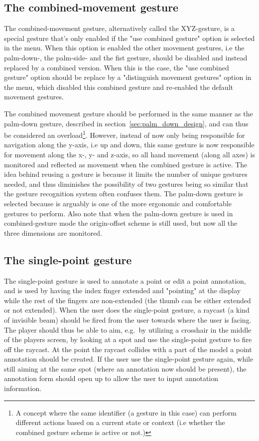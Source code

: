 \subsection{The combined-movement gesture}
\label{sec:combined-movement}
The combined-movement gesture, alternatively called the XYZ-gesture, is a special gesture that's only enabled if the "use combined gesture" option is selected in the menu.
When this option is enabled the other movement gestures, i.e the palm-down-, the palm-side- and the fist gesture, should be disabled and instead replaced by a combined version. 
When this is the case, the "use combined gesture" option should be replace by a "distinguish movement gestures" option in the menu, 
which disabled this combined gesture and re-enabled the default movement gestures. 

The combined movement gesture should be performed in the same manner as the palm-down gesture, described in section~\vref{sec:palm_down_design}, 
and can thus be considered an overload\footnote{A concept where the same identifier (a gesture in this case) can perform different actions based on a current state or context (i.e whether the combined gesture scheme is active or not.)}.
However, instead of now only being responsible for navigation along the y-axis, i.e up and down, this same gesture is now responsible for movement along the x-, y- and z-axis, so
all hand movement (along all axes) is monitored and reflected as movement when the combined gesture is active.
The idea behind reusing a gesture is because it limits the number of unique gestures needed, and thus diminishes the possibility of two gestures being so similar 
that the gesture recognition system often confuses them. The palm-down gesture is selected because is arguably is one of the more ergonomic and comfortable gestures to perform. 
Also note that when the palm-down gesture is used in combined-gesture mode the origin-offset scheme is still used, but now all the three dimensions are monitored. 

\subsection{The single-point gesture}
The single-point gesture is used to annotate a point or edit a point annotation, and is used by having the index finger extended and "pointing" at the display while the 
rest of the fingers are non-extended (the thumb can be either extended or not extended). 
When the user does the single-point gesture, a raycast (a kind of invisible beam) should be fired from the user towards where the user is facing.
The player should thus be able to aim, e.g.~by utilizing a crosshair in the middle of the players screen, by looking at a spot and use the single-point gesture to fire off 
the raycast. At the point the raycast collides with a part of the model a point annotation should be created. If the user use the single-point gesture again, while
still aiming at the same spot (where an annotation now should be present), the annotation form should open up to allow the user to input annotation information. 

